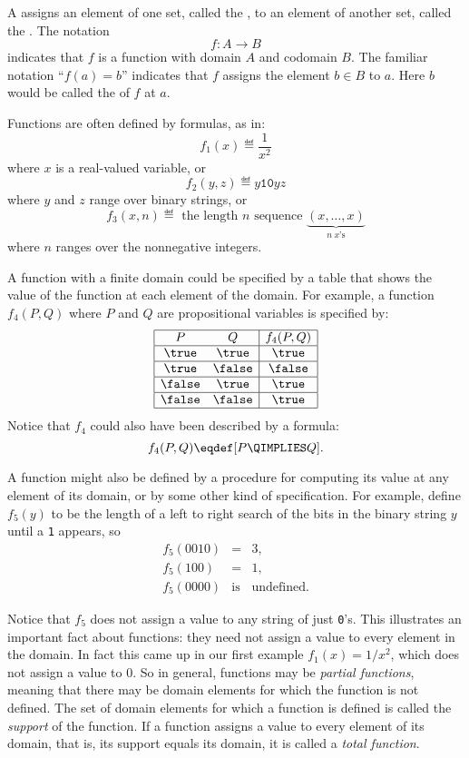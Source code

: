 A  assigns an element of one set, called the
, to an element of another set, called the
.  The notation
\[
f: A \to B
\]
indicates that $f$ is a function with domain $A$ and codomain $B$.  The
familiar notation ``$f(a) = b$'' indicates that $f$ assigns the element $b
\in B$ to $a$.  Here $b$ would be called the  of $f$ at
 $a$.

Functions are often defined by formulas, as in:
\[
f_1(x) \eqdef \frac{1}{x^2}
\]
where $x$ is a real-valued variable, or
\[
f_2(y,z) \eqdef y\mathtt{10}yz
\]
where $y$ and $z$ range over binary strings, or
\[
f_3(x, n) \eqdef \text{ the length $n$ sequence } \underbrace{(x, \dots, x)}_{n\ x\text{'s}}
\]
where $n$ ranges over the nonnegative integers.

A function with a finite domain could be specified by a table that shows
the value of the function at each element of the domain.  For example, a function
$f_4(P,Q)$ where $P$ and $Q$ are propositional variables is specified by:
\[\begin{array}{|cc|c|}
\hline
P & Q & f_4(P,Q)\\
\hline \true & \true & \true\\
\hline \true & \false & \false\\
\hline \false & \true & \true\\
\hline \false & \false & \true\\
\hline
\end{array}\]
Notice that $f_4$ could also have been described by a formula:
\[
f_4(P,Q)  \eqdef [P \QIMPLIES Q].
\]

A function might also be defined by a procedure for computing its value at
any element of its domain, or by some other kind of specification.  For
example, define $f_5(y)$ to be the length of a left to right search of the
bits in the binary string $y$ until a \texttt{1} appears, so
\begin{eqnarray*}
f_5(0010) & = &  3,\\
f_5(100)  & = & 1,\\
f_5(0000) & \text{is} & \text{undefined}.
\end{eqnarray*}

Notice that $f_5$ does not assign a value to any string of just
\texttt{0}'s.  This illustrates an important fact about functions:
they need not assign a value to every element in the domain.  In fact
this came up in our first example $f_1(x)=1/x^2$, which does not
assign a value to $0$.  So in general, functions may be \emph{partial%
   functions}, meaning that there may be
domain elements for which the function is not defined.  The set of
domain elements for which a function is defined is called the
\emph{support}  of the function.  If a
function assigns a value to every element of its domain, that is, its
support equals its domain, it is called a \emph{total
   function}.

